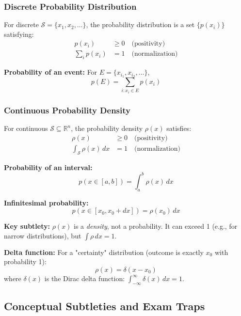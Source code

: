 \documentclass[9pt,twocoloumn]{article}
\begin{document}
\subsubsection{Discrete Probability Distribution}

For discrete $\mathcal{S} = \{x_1, x_2, \ldots\}$, the probability distribution is a set $\{p(x_i)\}$ satisfying:
\begin{align}
p(x_i) &\geq 0 \quad \text{(positivity)} \\
\sum_i p(x_i) &= 1 \quad \text{(normalization)}
\end{align}

\textbf{Probability of an event:} For $E = \{x_{i_1}, x_{i_2}, \ldots\}$,
\begin{equation}
p(E) = \sum_{i: x_i \in E} p(x_i)
\end{equation}

\subsubsection{Continuous Probability Density}

For continuous $\mathcal{S} \subseteq \mathbb{R}^n$, the probability density $\rho(x)$ satisfies:
\begin{align}
\rho(x) &\geq 0 \quad \text{(positivity)} \\
\int_{\mathcal{S}} \rho(x) \, dx &= 1 \quad \text{(normalization)}
\end{align}

\textbf{Probability of an interval:}
\begin{equation}
p(x \in [a, b]) = \int_a^b \rho(x) \, dx
\end{equation}

\textbf{Infinitesimal probability:}
\begin{equation}
p(x \in [x_0, x_0 + dx]) = \rho(x_0) \, dx
\end{equation}

\textbf{Key subtlety:} $\rho(x)$ is a \emph{density}, not a probability. It can exceed 1 (e.g., for narrow distributions), but $\int \rho \, dx = 1$.

\textbf{Delta function:} For a "certainty" distribution (outcome is exactly $x_0$ with probability 1):
\begin{equation}
\rho(x) = \delta(x - x_0)
\end{equation}
where $\delta(x)$ is the Dirac delta function: $\int_{-\infty}^\infty \delta(x) \, dx = 1$.

\subsection{Conceptual Subtleties and Exam Traps}
\end{document}
